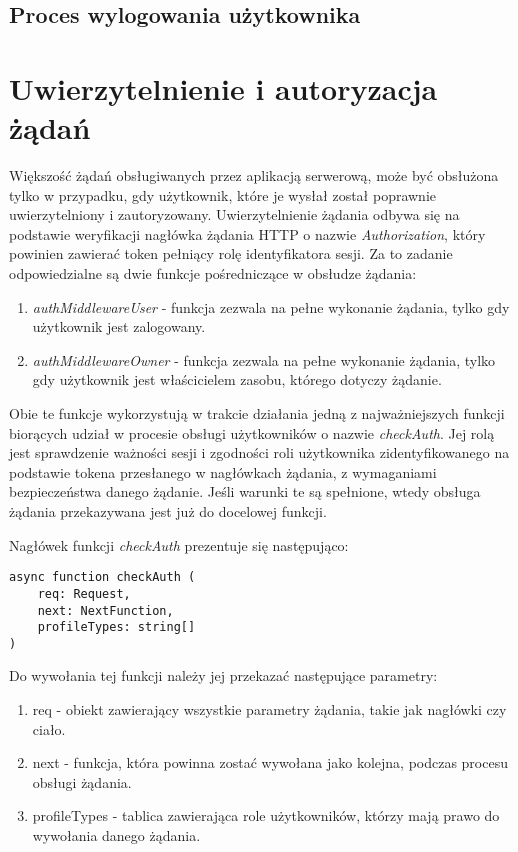 \documentclass[a4paper,12pt,twoside,openany]{report}
\begin{document}
\subsection{Proces wylogowania użytkownika}

\section{Uwierzytelnienie i autoryzacja żądań}
Większość żądań obsługiwanych przez aplikacją serwerową, może być obsłużona tylko w przypadku, gdy użytkownik, które je wysłał został poprawnie uwierzytelniony i zautoryzowany. 
Uwierzytelnienie żądania odbywa się na podstawie weryfikacji nagłówka żądania HTTP o nazwie \textit{Authorization}, który powinien zawierać token pełniący rolę identyfikatora sesji. Za to zadanie odpowiedzialne są dwie funkcje pośredniczące w obsłudze żądania: 
\begin{enumerate}
	
	\item \textit{authMiddlewareUser} - funkcja zezwala na pełne wykonanie żądania, tylko gdy użytkownik jest zalogowany.
	
	\item \textit{authMiddlewareOwner} - funkcja zezwala na pełne wykonanie żądania, tylko gdy użytkownik jest właścicielem zasobu, którego dotyczy żądanie.
	
\end{enumerate}

Obie te funkcje wykorzystują w trakcie działania jedną z najważniejszych funkcji biorących udział w procesie obsługi użytkowników o nazwie \textit{checkAuth}. Jej rolą jest sprawdzenie ważności sesji i zgodności roli użytkownika zidentyfikowanego na podstawie tokena przesłanego w nagłówkach żądania, z wymaganiami bezpieczeństwa danego żądanie. Jeśli warunki te są spełnione, wtedy obsługa żądania przekazywana jest już do docelowej funkcji. 

Nagłówek funkcji \textit{checkAuth} prezentuje się następująco:
\begin{verbatim}
async function checkAuth (
    req: Request,
    next: NextFunction,                        
    profileTypes: string[]
)
\end{verbatim}
Do wywołania tej funkcji należy jej przekazać następujące parametry:
\begin{enumerate}
	
	\item req - obiekt zawierający wszystkie parametry żądania, takie jak nagłówki czy ciało.
	
	\item next - funkcja, która powinna zostać wywołana jako kolejna, podczas procesu obsługi żądania.
	
	\item profileTypes - tablica zawierająca role użytkowników, którzy mają prawo do wywołania danego żądania.
\end{enumerate}
\end{document}
